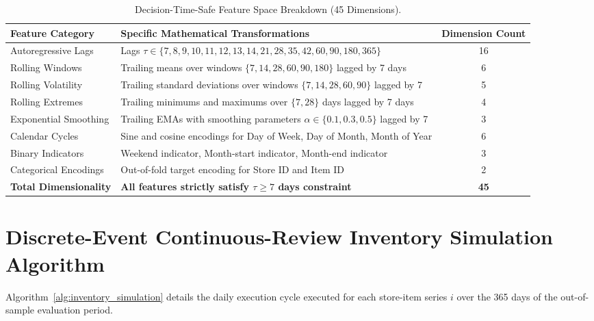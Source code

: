 \begin{table}[htbp]
\centering
\small
\caption{Decision-Time-Safe Feature Space Breakdown (45 Dimensions).}
\label{tab:app_features}
\begin{tabular}{lp{9cm}c}
\toprule
\textbf{Feature Category} & \textbf{Specific Mathematical Transformations} & \textbf{Dimension Count} \\
\midrule
Autoregressive Lags & Lags $\tau \in \{7, 8, 9, 10, 11, 12, 13, 14, 21, 28, 35, 42, 60, 90, 180, 365\}$ & 16 \\
Rolling Windows & Trailing means over windows $\{7, 14, 28, 60, 90, 180\}$ lagged by 7 days & 6 \\
Rolling Volatility & Trailing standard deviations over windows $\{7, 14, 28, 60, 90\}$ lagged by 7 & 5 \\
Rolling Extremes & Trailing minimums and maximums over $\{7, 28\}$ days lagged by 7 days & 4 \\
Exponential Smoothing & Trailing EMAs with smoothing parameters $\alpha \in \{0.1, 0.3, 0.5\}$ lagged by 7 & 3 \\
Calendar Cycles & Sine and cosine encodings for Day of Week, Day of Month, Month of Year & 6 \\
Binary Indicators & Weekend indicator, Month-start indicator, Month-end indicator & 3 \\
Categorical Encodings & Out-of-fold target encoding for Store ID and Item ID & 2 \\
\midrule
\textbf{Total Dimensionality} & \textbf{All features strictly satisfy $\tau \ge 7$ days constraint} & \textbf{45} \\
\bottomrule
\end{tabular}
\end{table}

\section{Discrete-Event Continuous-Review Inventory Simulation Algorithm}
\label{app:algorithm}

Algorithm~\ref{alg:inventory_simulation} details the daily execution cycle executed for each store-item series $i$ over the 365 days of the out-of-sample evaluation period.

